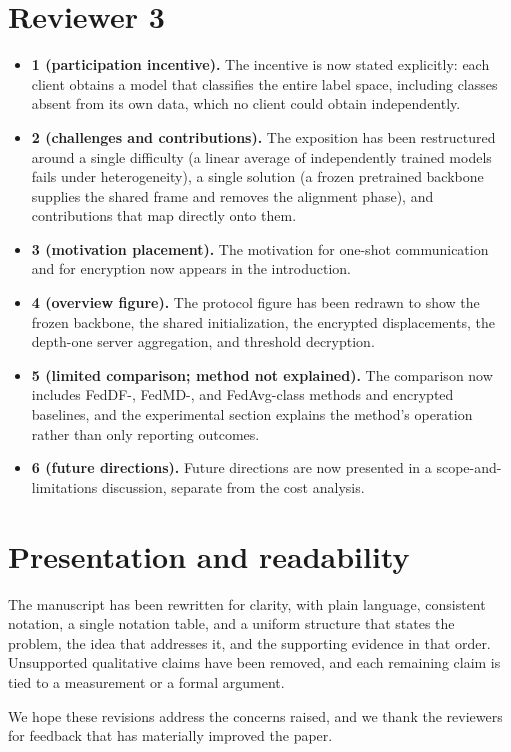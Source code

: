 \documentclass[11pt]{article}
\begin{document}
\section*{Reviewer 3}

\begin{itemize}
\item \textbf{1 (participation incentive).} The incentive is now stated explicitly: each client obtains a
model that classifies the entire label space, including classes absent from its own data, which no client
could obtain independently.

\item \textbf{2 (challenges and contributions).} The exposition has been restructured around a single
difficulty (a linear average of independently trained models fails under heterogeneity), a single solution (a
frozen pretrained backbone supplies the shared frame and removes the alignment phase), and contributions that
map directly onto them.

\item \textbf{3 (motivation placement).} The motivation for one-shot communication and for encryption now
appears in the introduction.

\item \textbf{4 (overview figure).} The protocol figure has been redrawn to show the frozen backbone, the
shared initialization, the encrypted displacements, the depth-one server aggregation, and threshold
decryption.

\item \textbf{5 (limited comparison; method not explained).} The comparison now includes FedDF-, FedMD-, and
FedAvg-class methods and encrypted baselines, and the experimental section explains the method's operation
rather than only reporting outcomes.

\item \textbf{6 (future directions).} Future directions are now presented in a scope-and-limitations
discussion, separate from the cost analysis.
\end{itemize}

\section*{Presentation and readability}

The manuscript has been rewritten for clarity, with plain language, consistent notation, a single notation
table, and a uniform structure that states the problem, the idea that addresses it, and the supporting
evidence in that order. Unsupported qualitative claims have been removed, and each remaining claim is tied to
a measurement or a formal argument.

We hope these revisions address the concerns raised, and we thank the reviewers for feedback that has
materially improved the paper.
\end{document}
